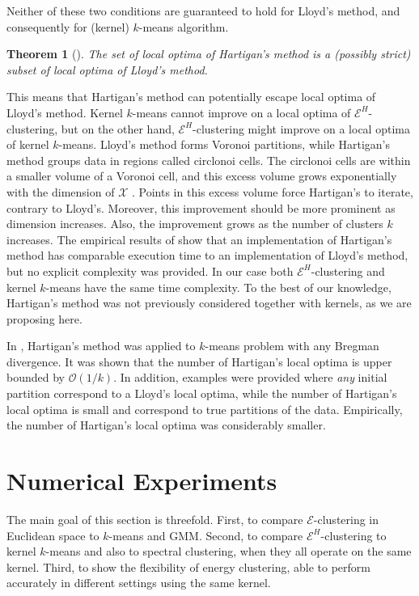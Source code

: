 \documentclass[twoside]{article}
\newtheorem{theorem}{Theorem}
\begin{document}
Neither of these two conditions are guaranteed to hold 
for Lloyd's method,
and consequently for (kernel) $k$-means algorithm. 

\begin{theorem}[\cite{Telgarsky}]
The set of local optima of Hartigan's method is a (possibly strict) subset
of local optima of Lloyd's method.
\end{theorem}

This means that Hartigan's method can potentially 
escape local optima of Lloyd's method.
Kernel $k$-means cannot
improve on a local optima of $\mathcal{E}^H$-clustering, but on the other hand,
$\mathcal{E}^H$-clustering might improve on a local optima of 
kernel $k$-means. 
Lloyd's method forms Voronoi partitions,
while Hartigan's method groups data
in regions called circlonoi cells.
The circlonoi cells are within
a smaller volume of a Voronoi cell, and this excess volume grows
exponentially with the dimension of $\mathcal{X}$ 
\citep[Theorems 2.4 and 3.1]{Telgarsky}. 
Points in this excess volume
force Hartigan's to iterate, contrary
to Lloyd's. 
Moreover, this improvement should be more prominent as
dimension increases. Also, the improvement grows as the number of clusters
$k$ increases.
The empirical results of \citep{Telgarsky} show that 
an implementation of Hartigan's method has comparable execution time 
to an implementation of
Lloyd's method,
but no explicit complexity was provided. In our case both
$\mathcal{E}^H$-clustering and kernel $k$-means
have the same time complexity. To the best of our knowledge, Hartigan's
method was not previously considered together with kernels, as we 
are proposing here.

In \citep{Slonin}, Hartigan's method was applied to $k$-means problem
with any Bregman divergence. It was shown that the number of Hartigan's
local optima is upper bounded by $\mathcal{O}(1/k)$. 
In addition, examples were provided where
\emph{any} initial partition correspond to a Lloyd's local optima, while  
the number of Hartigan's local optima  is small and 
correspond to true partitions of the data. Empirically, the number of
Hartigan's local optima was considerably smaller.


\section{Numerical Experiments}
\label{sec:numerics}

The main goal of this section is threefold. First, to compare
$\mathcal{E}$-clustering in Euclidean space 
to $k$-means and GMM. 
Second, to compare $\mathcal{E}^H$-clustering  to
kernel $k$-means and also to spectral clustering, when they all operate
on the same kernel.
Third, to show the flexibility
of energy clustering, able to perform 
accurately in different settings using the same kernel.
\end{document}
